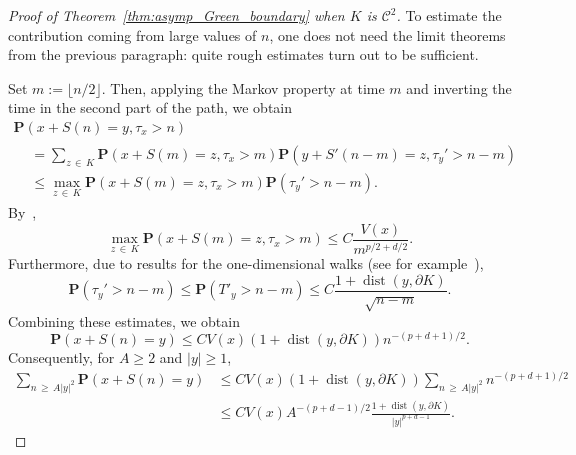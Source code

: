 \documentclass[AHL,Unicode,longabstracts,published]{cedram}
\DeclareMathOperator{\dist}{dist}
\newcommand{\clC}{\mathcal{C}}
\newcommand{\pr}{\mathbf{P}}
\renewcommand{\le}{\leqslant}
\renewcommand{\ge}{\geqslant}
\begin{document}
\begin{proof}[Proof of Theorem~\ref{thm:asymp_Green_boundary} when $K$ is $\clC^{2}$]
To estimate the contribution coming from large values of $n$, one does not need the limit theorems from the previous paragraph: quite rough estimates turn out to be sufficient.

Set $m:=\lfloor n/2\rfloor$. Then, applying the Markov property at time $m$ and inverting the time in the second part of the path, we obtain
\begin{multline*}
\pr\left(x+S(n)=y,\tau_x>n\right)\\
\begin{aligned}
&=\sum_{z\,\in\,K}\pr\left(x+S(m)=z,\tau_x>m\right)\pr\left(y+S'(n-m)=z,\tau_y'>n-m\right)\\
&\le\max_{z\,\in\,K}\pr\left(x+S(m)=z,\tau_x>m\right)\pr\left(\tau_y'>n-m\right).
\end{aligned}
\end{multline*}
By~\cite[Theorem~5]{DeWa-15},
\[
\max_{z\,\in\,K}\pr\left(x+S(m)=z,\tau_x>m\right)\le C\frac{V(x)}{m^{p/2+d/2}}.
\]
Furthermore, due to results for the one-dimensional walks (see for example~\cite[Lemma~3]{DeWa-16}),
\begin{equation}\label{3.step.1}
\pr\left(\tau_y'>n-m\right)\le \pr\left(T'_y>n-m\right)\le C\frac{1+\dist\left(y,\partial K\right)}{\sqrt{n-m}}.
\end{equation}
Combining these estimates, we obtain
\[
\pr\left(x+S(n)=y\right)\le CV(x)\left(1+\dist(y,\partial K)\right)n^{-(p+d+1)/2}.
\]
Consequently, for $A\ge2$ and $| y|\ge1$,
\begin{equation}\label{3.step}
\begin{aligned}
\sum_{n\,\ge\,A|y|^2}\pr\left(x+S(n)=y\right) &\le CV(x)\left(1+\dist(y,\partial K)\right)\sum_{n\,\ge\,A|y|^2}n^{-(p+d+1)/2}\\
&\le CV(x)A^{-(p+d-1)/2}\frac{1+\dist(y,\partial K)}{| y|^{p+d-1}}.
\end{aligned}
\end{equation}


\end{proof}
\end{document}
